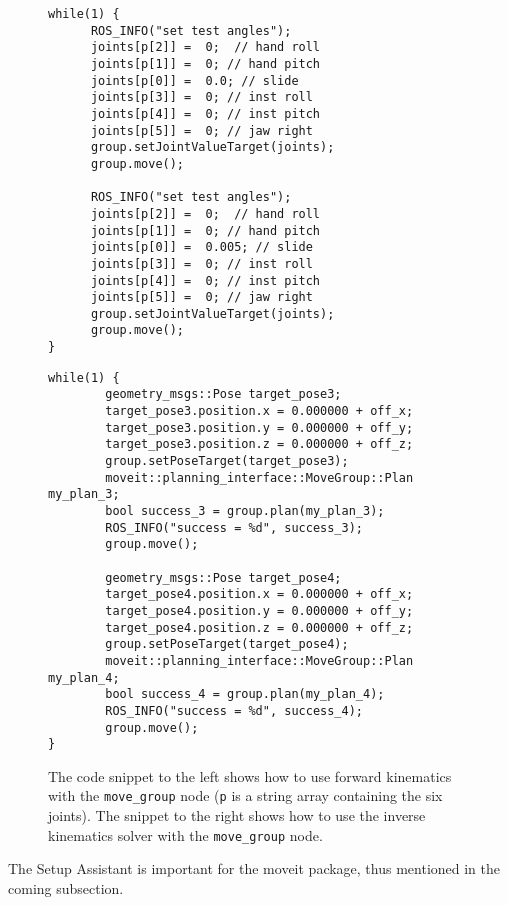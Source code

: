 \begin{figure}[h]
    \centering
    \begin{minipage}{.5\textwidth}
\begin{lstlisting}[language=gedit]
while(1) {
      ROS_INFO("set test angles");
      joints[p[2]] =  0;  // hand roll
      joints[p[1]] =  0; // hand pitch
      joints[p[0]] =  0.0; // slide
      joints[p[3]] =  0; // inst roll
      joints[p[4]] =  0; // inst pitch
      joints[p[5]] =  0; // jaw right
      group.setJointValueTarget(joints);
      group.move();

      ROS_INFO("set test angles");
      joints[p[2]] =  0;  // hand roll
      joints[p[1]] =  0; // hand pitch
      joints[p[0]] =  0.005; // slide
      joints[p[3]] =  0; // inst roll
      joints[p[4]] =  0; // inst pitch
      joints[p[5]] =  0; // jaw right
      group.setJointValueTarget(joints);
      group.move();
}
\end{lstlisting}
    \end{minipage}%
    \begin{minipage}{0.5\textwidth}
\begin{lstlisting}[language=gedit]
while(1) {
        geometry_msgs::Pose target_pose3;
        target_pose3.position.x = 0.000000 + off_x;
        target_pose3.position.y = 0.000000 + off_y;
        target_pose3.position.z = 0.000000 + off_z;
        group.setPoseTarget(target_pose3);
        moveit::planning_interface::MoveGroup::Plan my_plan_3;
        bool success_3 = group.plan(my_plan_3);
        ROS_INFO("success = %d", success_3);
        group.move();

        geometry_msgs::Pose target_pose4;
        target_pose4.position.x = 0.000000 + off_x;
        target_pose4.position.y = 0.000000 + off_y;
        target_pose4.position.z = 0.000000 + off_z;
        group.setPoseTarget(target_pose4);
        moveit::planning_interface::MoveGroup::Plan my_plan_4;
        bool success_4 = group.plan(my_plan_4);
        ROS_INFO("success = %d", success_4);
        group.move();
}
\end{lstlisting}
    \end{minipage}
    \caption{The code snippet to the left shows how to use forward kinematics with the \texttt{move\_group} node (\texttt{p} is a string array containing the six joints). The snippet to the right shows how to use the inverse kinematics solver with the \texttt{move\_group} node.}\label{fig:code-eks-moveit}
\end{figure}
The Setup Assistant is important for the moveit package, thus mentioned in the coming subsection.

